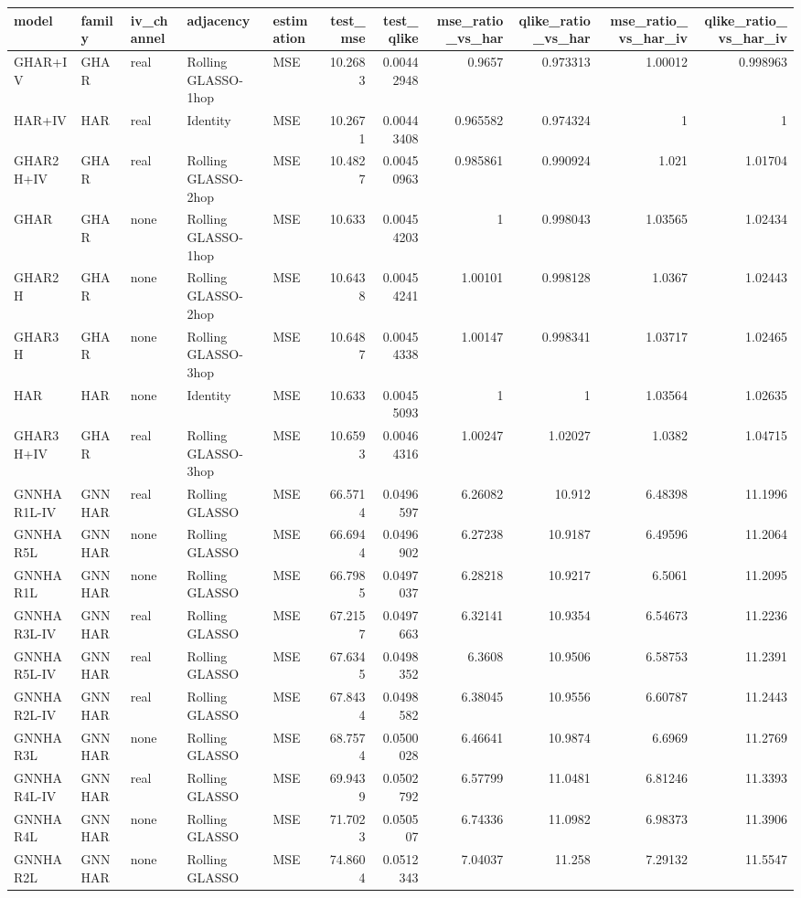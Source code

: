 \begin{tabular}{lllllrrrrrr}
\toprule
model & family & iv_channel & adjacency & estimation & test_mse & test_qlike & mse_ratio_vs_har & qlike_ratio_vs_har & mse_ratio_vs_har_iv & qlike_ratio_vs_har_iv \\
\midrule
GHAR+IV & GHAR & real & Rolling GLASSO-1hop & MSE & 10.2683 & 0.00442948 & 0.9657 & 0.973313 & 1.00012 & 0.998963 \\
HAR+IV & HAR & real & Identity & MSE & 10.2671 & 0.00443408 & 0.965582 & 0.974324 & 1 & 1 \\
GHAR2H+IV & GHAR & real & Rolling GLASSO-2hop & MSE & 10.4827 & 0.00450963 & 0.985861 & 0.990924 & 1.021 & 1.01704 \\
GHAR & GHAR & none & Rolling GLASSO-1hop & MSE & 10.633 & 0.00454203 & 1 & 0.998043 & 1.03565 & 1.02434 \\
GHAR2H & GHAR & none & Rolling GLASSO-2hop & MSE & 10.6438 & 0.00454241 & 1.00101 & 0.998128 & 1.0367 & 1.02443 \\
GHAR3H & GHAR & none & Rolling GLASSO-3hop & MSE & 10.6487 & 0.00454338 & 1.00147 & 0.998341 & 1.03717 & 1.02465 \\
HAR & HAR & none & Identity & MSE & 10.633 & 0.00455093 & 1 & 1 & 1.03564 & 1.02635 \\
GHAR3H+IV & GHAR & real & Rolling GLASSO-3hop & MSE & 10.6593 & 0.00464316 & 1.00247 & 1.02027 & 1.0382 & 1.04715 \\
GNNHAR1L-IV & GNNHAR & real & Rolling GLASSO & MSE & 66.5714 & 0.0496597 & 6.26082 & 10.912 & 6.48398 & 11.1996 \\
GNNHAR5L & GNNHAR & none & Rolling GLASSO & MSE & 66.6944 & 0.0496902 & 6.27238 & 10.9187 & 6.49596 & 11.2064 \\
GNNHAR1L & GNNHAR & none & Rolling GLASSO & MSE & 66.7985 & 0.0497037 & 6.28218 & 10.9217 & 6.5061 & 11.2095 \\
GNNHAR3L-IV & GNNHAR & real & Rolling GLASSO & MSE & 67.2157 & 0.0497663 & 6.32141 & 10.9354 & 6.54673 & 11.2236 \\
GNNHAR5L-IV & GNNHAR & real & Rolling GLASSO & MSE & 67.6345 & 0.0498352 & 6.3608 & 10.9506 & 6.58753 & 11.2391 \\
GNNHAR2L-IV & GNNHAR & real & Rolling GLASSO & MSE & 67.8434 & 0.0498582 & 6.38045 & 10.9556 & 6.60787 & 11.2443 \\
GNNHAR3L & GNNHAR & none & Rolling GLASSO & MSE & 68.7574 & 0.0500028 & 6.46641 & 10.9874 & 6.6969 & 11.2769 \\
GNNHAR4L-IV & GNNHAR & real & Rolling GLASSO & MSE & 69.9439 & 0.0502792 & 6.57799 & 11.0481 & 6.81246 & 11.3393 \\
GNNHAR4L & GNNHAR & none & Rolling GLASSO & MSE & 71.7023 & 0.050507 & 6.74336 & 11.0982 & 6.98373 & 11.3906 \\
GNNHAR2L & GNNHAR & none & Rolling GLASSO & MSE & 74.8604 & 0.0512343 & 7.04037 & 11.258 & 7.29132 & 11.5547 \\
\bottomrule
\end{tabular}
